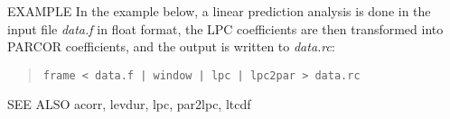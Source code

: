 \begin{qsection}{EXAMPLE}
In the example below, a linear prediction analysis is
done in the input file {\em data.f} in float format,
the LPC coefficients are then transformed into PARCOR coefficients,
and the output is written to {\em data.rc}:
\begin{quote}
 \verb!frame < data.f | window | lpc | lpc2par > data.rc!
\end{quote} 
\end{qsection}

\begin{qsection}{SEE ALSO}
 acorr, levdur, lpc, par2lpc, ltcdf
\end{qsection}
